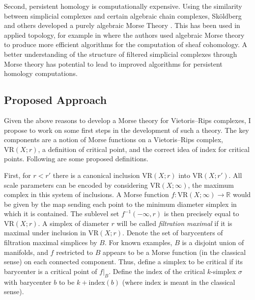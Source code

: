 \documentclass[11pt]{amsart}
\newcommand{\R}{\mathbb{R}}
\newcommand{\vr}[2]{\mathrm{VR}(#1;#2)}
\begin{document}

Second, persistent homology is computationally expensive.
Using the similarity between simplicial complexes and certain algebraic chain complexes, Sk\"{o}ldberg and others developed a purely algebraic Morse Theory \cite{SkoldbergMorsetheoryalgebraic2006}.
This has been used in applied topology, for example in \cite{CurryDiscreteMorsetheory2016} where the authors used algebraic Morse theory to produce more efficient algorithms for the computation of sheaf cohomology.
A better understanding of the structure of filtered simplicial complexes through Morse theory has potential to lead to improved algorithms for persistent homology computations.

\subsection{Proposed Approach}
Given the above reasons to develop a Morse theory for Vietoris--Rips complexes, I propose to work on some first steps in the development of such a theory.
The key components are a notion of Morse functions on a Vietoris--Rips complex, $\vr{X}{r}$, a definition of critical point, and the correct idea of index for critical points.
Following are some proposed definitions.

First, for $r < r'$ there is a canonical inclusion $\vr{X}{r}$ into $\vr{X}{r'}$.
All scale parameters can be encoded by considering $\vr{X}{\infty}$, the maximum complex in this system of inclusions.%
A Morse function $f \colon \vr{X}{\infty} \to \R$ would be given by the map sending each point to the minimum diameter simplex in which it is contained.
The sublevel set $f^{-1}(-\infty,r)$ is then precisely equal to $\vr{X}{r}$.
A simplex of diameter $r$ will be called \emph{filtration maximal} if it is maximal under inclusion in $\vr{X}{r}$.
Denote the set of barycenters of filtration maximal simplices by $B$.
For known examples, $B$ is a disjoint union of manifolds, and $f$ restricted to $B$ appears to be a Morse function (in the classical sense) on each connected component.
Thus, define a simplex to be critical if its barycenter is a critical point of $f\vert_B$.
Define the index of the critical $k$-simplex $\sigma$ with barycenter $b$ to be $k + \mathrm{index}(b)$ (where index is meant in the classical sense).
\end{document}
